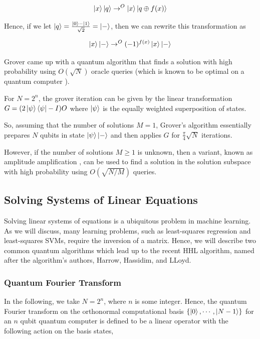 \documentclass[12]{amsart}
\newcommand\0{\mathbf{0}}
\newcommand\<{\langle}
\renewcommand\>{\rangle}
\begin{document}
\begin{align*}
\ket{x}\ket{q} \rightarrow^O \ket{x}\ket{q \oplus f(x)}
\end{align*}

Hence, if we let $\ket{q} = \frac{\ket{0}-\ket{1}}{\sqrt{2}} = \ket{-}$, then we can rewrite this transformation as

\begin{align*}
\ket{x}\ket{-} \rightarrow^O (-1)^{f(x)}\ket{x}\ket{-}	
\end{align*}

Grover \cite{grover1996fast} came up with a quantum algorithm that finds a solution with high probability using $O(\sqrt{N})$ oracle queries (which is known to be optimal on a quantum computer \cite{nielsen2010quantum}).

For $N = 2^n$, the grover iteration can be given by the linear transformation $G = (2\ket{\psi}\bra{\psi}-I)O$ where $\ket{\psi}$ is the equally weighted superposition of states. 

So, assuming that the number of solutions $M = 1$, Grover's algorithm essentially prepares $N$ qubits in state $\ket{\psi}\ket{-}$ and then applies $G$ for $\frac{\pi}{4}\sqrt{N}$ iterations. 

However, if the number of solutions $M \geq 1$ is unknown, then a variant, known as amplitude amplification \cite{brassard2002quantum}, can be used to find a solution in the solution subspace with high probability using $O(\sqrt{N/M})$ queries. 
   
\subsection{Solving Systems of Linear Equations}

Solving linear systems of equations is a ubiquitous problem in machine learning. As we will discuss, many learning problems, such as least-squares regression and least-squares SVMs, require the inversion of a matrix. Hence, we will describe two common quantum algorithms which lead up to the recent HHL algorithm, named after the algorithm's authors, Harrow, Hassidim, and LLoyd.

\subsubsection{Quantum Fourier Transform}

In the following, we take $N = 2^n$, where $n$ is some integer. Hence, the quantum Fourier transform on the orthonormal computational basis $\{ \ket{0}, \cdots ,\ket{N - 1} \}$ for an $n$ qubit quantum computer is defined to be a linear operator with the following action on the basis states,
\end{document}
